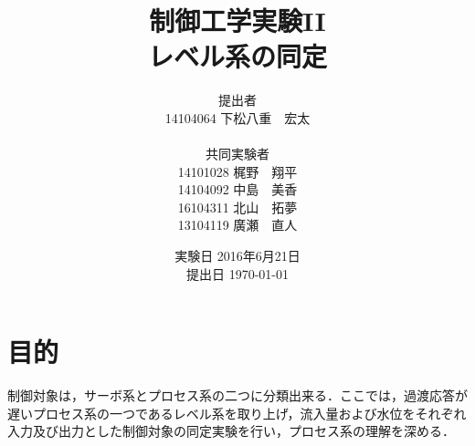 \documentclass[11pt,a4paper]{jsarticle}
\begin{document}
\title{制御工学実験II \\ レベル系の同定}
\author{提出者 \\ 14104064 下松八重　宏太 \\ \\ 共同実験者 \\ 14101028 梶野　翔平 \\ 14104092 中島　美香 \\ 16104311 北山　拓夢 \\ 13104119 廣瀬　直人}
\date{実験日 2016年6月21日 \\ 提出日 \today}



\maketitle
\thispagestyle{empty}
\newpage


 \section{目的}
制御対象は，サーボ系とプロセス系の二つに分類出来る．ここでは，過渡応答が遅いプロセス系の一つであるレベル系を取り上げ，流入量および水位をそれぞれ入力及び出力とした制御対象の同定実験を行い，プロセス系の理解を深める．
\end{document}
